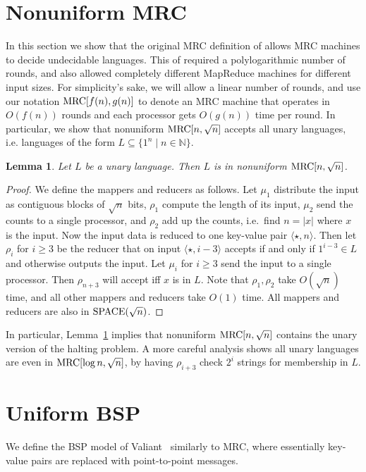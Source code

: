 \documentclass[11pt]{article}
\newtheorem{lemma}[theorem]{Lemma}
\theoremstyle{definition}
\theoremstyle{remark}
\newcommand{\N}{\mathbb{N}}
\newcommand{\mrc}{\textup{MRC}}
\newcommand{\SPACE}{\textup{SPACE}}
\begin{document}
\appendix
\section{Nonuniform MRC}
In this section we show that the original MRC definition of \cite{Karloff10}
allows MRC machines to decide undecidable languages.
This of  required a polylogarithmic number
of rounds, and also allowed completely different MapReduce machines for
different input sizes.
For simplicity's sake, we will allow a linear number of rounds,
and use our notation $\mrc[f(n), g(n)]$ to denote an MRC machine
that operates in $O(f(n))$ rounds and each processor gets $O(g(n))$ time
per round.
In particular, we show that
nonuniform $\mrc[n, \sqrt{n}]$ accepts all unary languages, i.e. languages of
the form $L \subseteq \{1^n \mid n \in \N\}$.

\begin{lemma}\label{lemma:unary}
Let $L$ be a unary language. Then $L$ is in nonuniform $\mrc[n, \sqrt{n}]$.
\end{lemma}

\begin{proof}
We define the mappers and reducers as follows. Let $\mu_1$ distribute the input
as contiguous blocks of $\sqrt{n}$ bits, $\rho_1$ compute the length of its
input, $\mu_2$ send the counts to a single processor, and $\rho_2$ add up the
counts, i.e.\ find $n=|x|$ where $x$ is the input. Now the input data is
reduced to one key-value pair $\langle \star, n \rangle$. Then let $\rho_i$ for
$i \ge 3$ be the reducer that on input $\langle \star, i-3 \rangle$ accepts if
and only if $1^{i-3} \in L$ and otherwise outputs the input. Let $\mu_i$ for $i
\ge 3$ send the input to a single processor. Then $\rho_{n+3}$ will accept iff
$x$ is in $L$. Note that $\rho_1, \rho_2$ take $O(\sqrt{n})$ time, and all
other mappers and reducers take $O(1)$ time. All mappers and reducers are also
in $\SPACE(\sqrt{n})$. \end{proof}

In particular, Lemma~\ref{lemma:unary} implies that nonuniform $\mrc[n,
\sqrt{n}]$ contains the unary version of the halting problem. A more careful
analysis shows all unary languages are even in $\mrc[\log n, \sqrt{n}]$, by
having $\rho_{i+3}$ check $2^i$ strings for membership in $L$.

\section{Uniform BSP}
We define the BSP model of Valiant~\cite{Valiant90} similarly to MRC, where
essentially key-value pairs are replaced with point-to-point messages.
\end{document}
